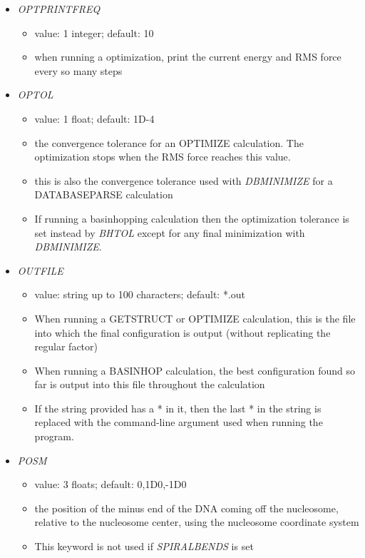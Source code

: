 \documentclass[12pt,dvips]{article}
\begin{document}
\begin{itemize}
%
\item {\it OPTPRINTFREQ}
  \begin{itemize}
    \item value: 1 integer; default: 10
    \item when running a optimization, print the current energy and RMS force every so many steps   
  \end{itemize}
%
\item {\it OPTOL}
  \begin{itemize}
    \item value: 1 float; default: 1D-4
    \item the convergence tolerance for an OPTIMIZE calculation. The optimization stops when the RMS force reaches this value. 
    \item this is also the convergence tolerance used with {\em DBMINIMIZE} for a DATABASEPARSE calculation
    \item If running a basinhopping calculation then the optimization tolerance is set instead by {\it BHTOL} except for any final minimization with {\it DBMINIMIZE}.
  \end{itemize}
%
\item {\it OUTFILE}
  \begin{itemize}
    \item value: string up to 100 characters; default: *.out
    \item When running a GETSTRUCT or OPTIMIZE calculation, this is the file into which the final configuration is output (without replicating the regular factor)
    \item When running a BASINHOP calculation, the best configuration found so far is output into this file throughout the calculation
    \item If the string provided has a * in it, then the last * in the string is replaced with the command-line argument used when running the program.    
  \end{itemize}
%
\item {\it POSM}
  \begin{itemize}
    \item value: 3 floats; default: 0,1D0,-1D0
    \item the position of the minus end of the DNA coming off the nucleosome, relative to the nucleosome center, using the nucleosome coordinate system
    \item This keyword is not used if {\em SPIRALBENDS} is set
  \end{itemize}

\end{itemize}
\end{document}
